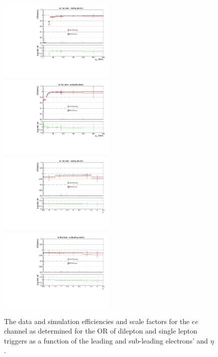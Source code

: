 \begin{figure}[ht]
\centering
\includegraphics[width=0.495\textwidth]{figs/background-estimation/triggerEfficiency/ttbar/electron1_pT_SF_alt.pdf}
\includegraphics[width=0.495\textwidth]{figs/background-estimation/triggerEfficiency/ttbar/electron2_pT_SF_alt.pdf}
\\
\includegraphics[width=0.495\textwidth]{figs/background-estimation/triggerEfficiency/ttbar/electron1_eta_SF_alt.pdf}
\includegraphics[width=0.495\textwidth]{figs/background-estimation/triggerEfficiency/ttbar/electron2_eta_SF_alt.pdf}
\caption{
The data and \ttbar simulation efficiencies and scale factors for the $ee$ channel as determined for the OR of dilepton and single lepton triggers as a function of the leading and sub-leading electrons' \pT and $\eta$.
}
\label{fig:App_trigEff_ee}
\end{figure}

